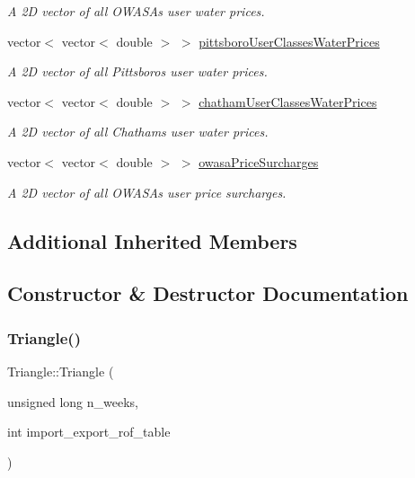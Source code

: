 \begin{DoxyCompactItemize}
\begin{DoxyCompactList}\small\item\em A 2D vector of all O\+W\+A\+SA\textquotesingle{}s user water prices. \end{DoxyCompactList}\item 
vector$<$ vector$<$ double $>$ $>$ \mbox{\hyperlink{classTriangle_a94cf854f70c4956acf77ff59491c6ef5}{pittsboro\+User\+Classes\+Water\+Prices}}
\begin{DoxyCompactList}\small\item\em A 2D vector of all Pittsboro\textquotesingle{}s user water prices. \end{DoxyCompactList}\item 
vector$<$ vector$<$ double $>$ $>$ \mbox{\hyperlink{classTriangle_abc00c472c31299d21d32fcc23a9d292f}{chatham\+User\+Classes\+Water\+Prices}}
\begin{DoxyCompactList}\small\item\em A 2D vector of all Chatham\textquotesingle{}s user water prices. \end{DoxyCompactList}\item 
vector$<$ vector$<$ double $>$ $>$ \mbox{\hyperlink{classTriangle_ae6fc047b9fb03b541036b0e8c6affba1}{owasa\+Price\+Surcharges}}
\begin{DoxyCompactList}\small\item\em A 2D vector of all O\+W\+A\+SA\textquotesingle{}s user price surcharges. \end{DoxyCompactList}\end{DoxyCompactItemize}
\subsection*{Additional Inherited Members}


\subsection{Constructor \& Destructor Documentation}
\mbox{\label{classTriangle_a24833bad242ddc3f671b36678dff5738}} 
\subsubsection{\texorpdfstring{Triangle()}{Triangle()}}
{\footnotesize\ttfamily Triangle\+::\+Triangle (\begin{DoxyParamCaption}\item[{unsigned long}]{n\+\_\+weeks,  }\item[{int}]{import\+\_\+export\+\_\+rof\+\_\+table }\end{DoxyParamCaption})}



